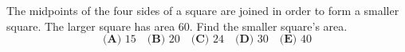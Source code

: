 The midpoints of the four sides of a square are joined in order to form a smaller square. The larger square has area $60$. Find the smaller square's area.
\[\textbf{(A) }15\quad\textbf{(B) }20\quad\textbf{(C) }24\quad\textbf{(D) }30\quad\textbf{(E) }40\]
